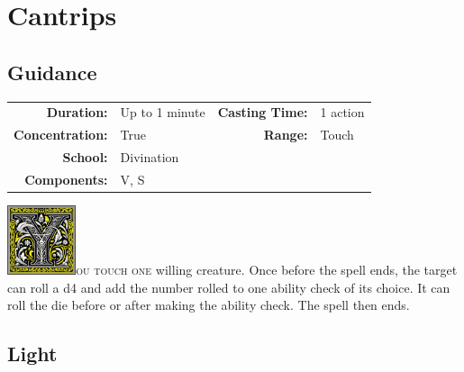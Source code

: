\documentclass[12pt,showtrims]{memoir}
\begin{document}
\mainmatter
{}
\pagestyle{ruled}
\chapter*{Cantrips} 
\section*{Guidance}

{
\small\centering\vspace{-6pt}
\begin{tabular}{rlrl}
\toprule

\textbf{Duration:} & Up to 1 minute &
\textbf{Casting Time:} & 1 action \\
\textbf{Concentration:} & True &
\textbf{Range:} & Touch \\
\textbf{School:} & Divination \\
\textbf{Components:} & \multicolumn{3}{p{0.7\textwidth}}{V, S}\\

\bottomrule
\end{tabular}
}

\vspace{1\baselineskip}\noindent
\lettrine[lines=4]{\includegraphics[height=58pt]{initials/Y.png}}{ou touch one} willing creature. Once before the spell ends, the target can roll a d4 and add the number rolled to one ability check of its choice. It can roll the die before or after making the ability check. The spell then ends.

\newpage
{}
\newpage
\section*{Light}
\end{document}
